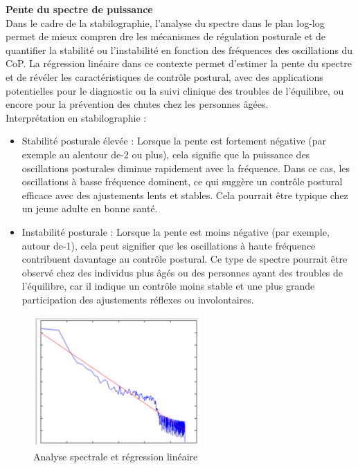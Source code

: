 \textbf{Pente du spectre de puissance}\\

Dans le cadre de la stabilographie, l’analyse du spectre dans le plan log-log permet de mieux compren
dre les mécanismes de régulation posturale et de quantifier la stabilité ou l’instabilité en fonction des
fréquences des oscillations du CoP. La régression linéaire dans ce contexte permet d’estimer la pente du
spectre et de révéler les caractéristiques de contrôle postural, avec des applications potentielles pour le
diagnostic ou la suivi clinique des troubles de l’équilibre, ou encore pour la prévention des chutes chez
les personnes âgées.\\

Interprétation en stabilographie :\\

\begin{itemize}
    \item Stabilité posturale élevée : Lorsque la pente est fortement négative (par exemple au alentour de-2 ou plus), cela signifie que la puissance des oscillations posturales diminue rapidement avec la
    fréquence. Dans ce cas, les oscillations à basse fréquence dominent, ce qui suggère un contrôle
    postural efficace avec des ajustements lents et stables. Cela pourrait être typique chez un jeune
    adulte en bonne santé.

    \item Instabilité posturale : Lorsque la pente est moins négative (par exemple, autour de-1), cela peut
    signifier que les oscillations à haute fréquence contribuent davantage au contrôle postural. Ce type
    de spectre pourrait être observé chez des individus plus âgés ou des personnes ayant des troubles de
    l’équilibre, car il indique un contrôle moins stable et une plus grande participation des ajustements
    réflexes ou involontaires.
\end{itemize}


\begin{figure}[H]
    \centering
    \includegraphics[height=5cm]{images/methode/analyse_spec_regre_lin.png}
    \caption{Analyse spectrale et régression linéaire}\label{fig:regression_lineaire}
\end{figure}